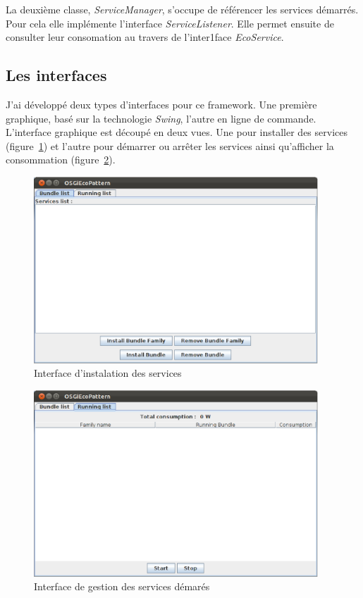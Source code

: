 \documentclass[a4paper, 11pt]{report}
\begin{document}
La deuxième classe, \textit{ServiceManager}, s'occupe de référencer les services démarrés. Pour cela elle implémente l'interface \textit{ServiceListener}. Elle permet ensuite de consulter leur consomation au travers de l'inter1face \textit{EcoService}.
		\subsection{Les interfaces}
J'ai développé deux types d'interfaces pour ce framework. Une première graphique, basé sur la technologie \textit{Swing}, l'autre en ligne de commande. L'interface graphique est découpé en deux vues. Une pour installer des services (figure~\ref{BdlList}) et l'autre pour démarrer ou arrêter les services ainsi qu'afficher la consommation (figure~\ref{RngList}).

\begin{figure}
	\centering
	\includegraphics[width=0.95\textwidth]{figures/EcoPattern_Bundle_List_View.eps}
	\caption{Interface d'instalation des services}
	\label{BdlList}
\end{figure}
\begin{figure}
	\centering
	\includegraphics[width=0.95\textwidth]{figures/EcoPattern_Running_List_View.eps}
	\caption{Interface de gestion des services démarés}
	\label{RngList}
\end{figure}
\end{document}
